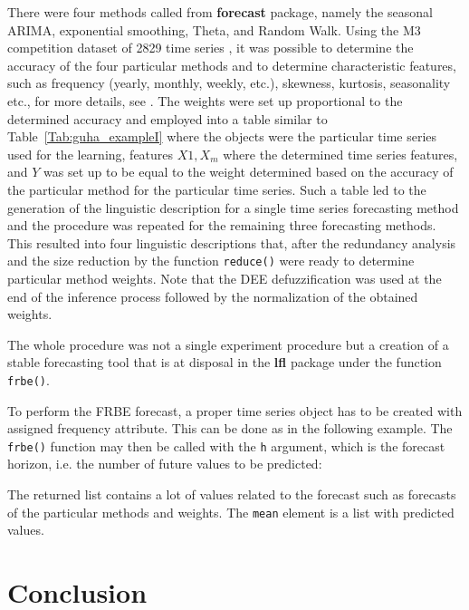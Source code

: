 \documentclass[review]{elsarticle}
\newcommand{\pkg}[1]{\textbf{#1}}
\newcommand{\code}[1]{\texttt{#1}}
\begin{document}
There were four methods called from \pkg{forecast} package, namely the seasonal ARIMA, exponential smoothing, Theta, and Random Walk. Using the M3 competition dataset of 2829 time series \citep{m3}, it was possible to determine the accuracy of the four particular methods and to determine characteristic features, such as frequency (yearly, monthly, weekly, etc.), skewness, kurtosis, seasonality etc., for more details, see \cite{frbe2014}. The weights were set up proportional to the determined accuracy and employed into a table similar to Table~\ref{Tab:guha_exampleI} where the objects were the particular time series used for the learning, features $X1, X_m$ where the determined time series features, and $Y$ was set up to be equal to the weight determined based on the accuracy of the particular method for the particular time series. Such a table led to the generation of the linguistic description for a single time series forecasting method and the procedure was repeated for the remaining three forecasting methods. This resulted into four linguistic descriptions that, after the redundancy analysis \citep{Dvorak_etal:RedundancyFSS} and the size reduction by the function \code{reduce()} were ready to determine particular method weights. Note that the DEE defuzzification was used at the end of the inference process followed by the normalization of the obtained weights. 

The whole procedure was not a single experiment procedure but a creation of a stable forecasting tool that is at disposal in the \pkg{lfl} package under the function \code{frbe()}.

To perform the FRBE forecast, a proper time series object has to be created with assigned frequency attribute. This can be done as in the following example. The \code{frbe()} function may then be called with the \code{h} argument, which is the forecast horizon, i.e. the number of future values to be predicted:
%

%
The returned list contains a lot of values related to the forecast such as forecasts of the particular methods and weights. The \code{mean} element is a list with predicted values.

\section{Conclusion}
\label{sec:conclusion}
\end{document}
